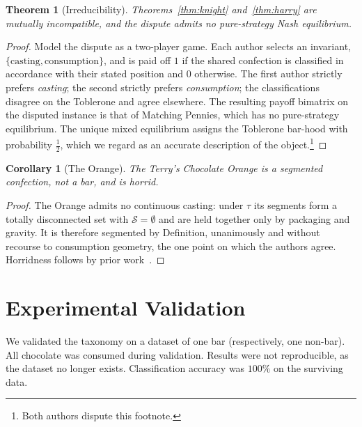 \documentclass[11pt]{article}
\theoremstyle{plain}
\newtheorem{theorem}{Theorem}
\newtheorem{corollary}{Corollary}
\theoremstyle{definition}
\theoremstyle{remark}
\newcommand{\score}{\mathcal{S}}
\begin{document}
\begin{theorem}[Irreducibility]\label{thm:noneq}
Theorems~\ref{thm:knight} and~\ref{thm:harry} are mutually incompatible,
and the dispute admits no pure-strategy Nash equilibrium.
\end{theorem}
\begin{proof}
Model the dispute as a two-player game. Each author selects an invariant,
\(\{\text{casting}, \text{consumption}\}\), and is paid off \(1\) if the
shared confection is classified in accordance with their stated position and
\(0\) otherwise. The first author strictly prefers \emph{casting}; the
second strictly prefers \emph{consumption}; the classifications disagree on
the Toblerone and agree elsewhere. The resulting payoff bimatrix on the
disputed instance is that of Matching Pennies, which has no pure-strategy
equilibrium. The unique mixed equilibrium assigns the Toblerone bar-hood
with probability \(\tfrac{1}{2}\), which we regard as an accurate
description of the object.\footnote{Both authors dispute this footnote.}
\qedhere
\end{proof}

\begin{corollary}[The Orange]\label{cor:orange}
The Terry's Chocolate Orange is a segmented confection, not a bar, and is
horrid.
\end{corollary}
\begin{proof}
The Orange admits no continuous casting: under \(\tau\) its segments form a
totally disconnected set with \(\score = \emptyset\) and are held together
only by packaging and gravity. It is therefore segmented by Definition,
unanimously and without recourse to consumption geometry, the one point on
which the authors agree. Horridness follows by prior
work~\cite{thispaper}. \qedhere
\end{proof}

\section{Experimental Validation}

We validated the taxonomy on a dataset of one bar (respectively, one
non-bar). All chocolate was consumed during validation. Results were not
reproducible, as the dataset no longer exists. Classification accuracy was
\(100\%\) on the surviving data.
\end{document}
